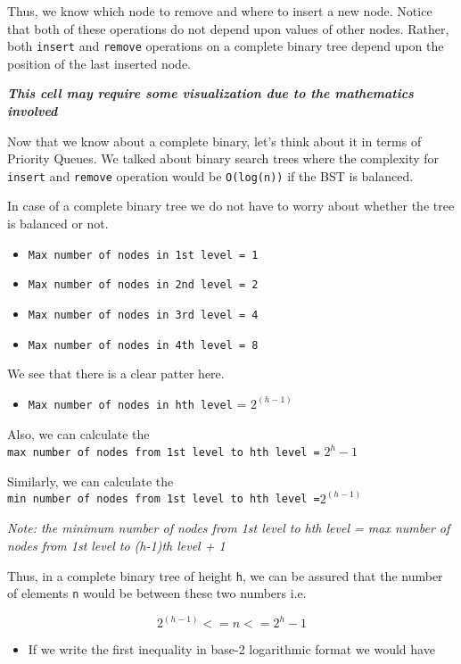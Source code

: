 \documentclass[11pt]{article}
\providecommand{\tightlist}{%
      \setlength{\itemsep}{0pt}\setlength{\parskip}{0pt}}
\begin{document}
Thus, we know which node to remove and where to insert a new node.
Notice that both of these operations do not depend upon values of other
nodes. Rather, both \texttt{insert} and \texttt{remove} operations on a
complete binary tree depend upon the position of the last inserted node.

    \textbf{\emph{This cell may require some visualization due to the
mathematics involved}}

Now that we know about a complete binary, let's think about it in terms
of Priority Queues. We talked about binary search trees where the
complexity for \texttt{insert} and \texttt{remove} operation would be
\texttt{O(log(n))} if the BST is balanced.

In case of a complete binary tree we do not have to worry about whether
the tree is balanced or not.

\begin{itemize}
\tightlist
\item
  \texttt{Max\ number\ of\ nodes\ in\ 1st\ level\ =\ 1}
\item
  \texttt{Max\ number\ of\ nodes\ in\ 2nd\ level\ =\ 2}
\item
  \texttt{Max\ number\ of\ nodes\ in\ 3rd\ level\ =\ 4}
\item
  \texttt{Max\ number\ of\ nodes\ in\ 4th\ level\ =\ 8}
\end{itemize}

We see that there is a clear patter here.

\begin{itemize}
\tightlist
\item
  \texttt{Max\ number\ of\ nodes\ in\ hth\ level} = \(2^{(h-1)}\)
\end{itemize}

Also, we can calculate the
\texttt{max\ number\ of\ nodes\ from\ 1st\ level\ to\ hth\ level\ =}
\(2^h - 1\)

Similarly, we can calculate the
\texttt{min\ number\ of\ nodes\ from\ 1st\ level\ to\ hth\ level\ =}\(2^{(h-1)}\)

\emph{Note: the minimum number of nodes from 1st level to hth level =
max number of nodes from 1st level to (h-1)th level + 1}

Thus, in a complete binary tree of height \texttt{h}, we can be assured
that the number of elements \texttt{n} would be between these two
numbers i.e.

\[ 2^{(h-1)}  <= n <= 2^h - 1\]

\begin{itemize}
\tightlist
\item
  If we write the first inequality in base-2 logarithmic format we would
  have
\end{itemize}
\end{document}
